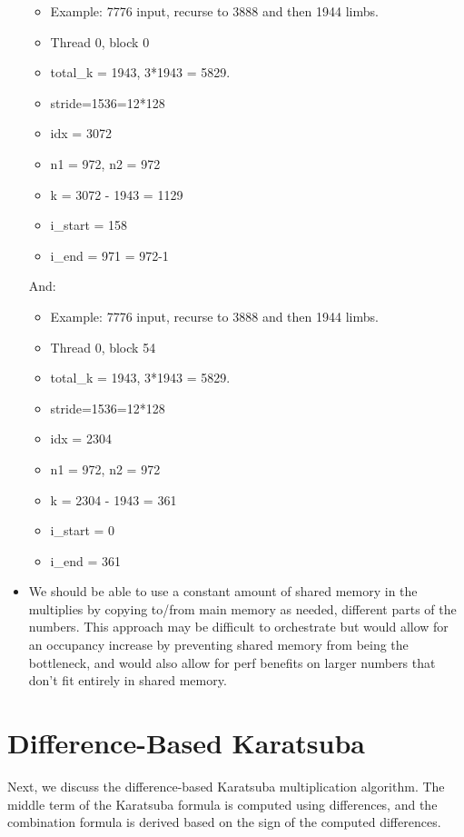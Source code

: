 \documentclass[12pt]{article}
\begin{document}
\begin{itemize}
    \begin{itemize}
    \item Example: 7776 input, recurse to 3888 and then 1944 limbs.
    \item Thread 0, block 0
    \item total\_k = 1943, 3*1943 = 5829.
    \item stride=1536=12*128
    \item idx = 3072
    \item n1 = 972, n2 = 972
    \item k = 3072 - 1943 = 1129
    \item i\_start = 158
    \item i\_end = 971 = 972-1
    \end{itemize}
    
    And:
    \begin{itemize}
    \item Example: 7776 input, recurse to 3888 and then 1944 limbs.
    \item Thread 0, block 54
    \item total\_k = 1943, 3*1943 = 5829.
    \item stride=1536=12*128
    \item idx = 2304
    \item n1 = 972, n2 = 972
    \item k = 2304 - 1943 = 361
    \item i\_start = 0
    \item i\_end = 361
    \end{itemize}
\item We should be able to use a constant amount of shared memory in the multiplies by copying to/from main memory as needed, different parts of the numbers.  This approach may be difficult to orchestrate but would allow for an occupancy increase by preventing shared memory from being the bottleneck, and would also allow for perf benefits on larger numbers that don't fit entirely in shared memory.
\end{itemize}


\section*{Difference-Based Karatsuba}
Next, we discuss the difference-based Karatsuba multiplication algorithm. The middle term of the Karatsuba formula is computed using differences, and the combination formula is derived based on the sign of the computed differences.
\end{document}
